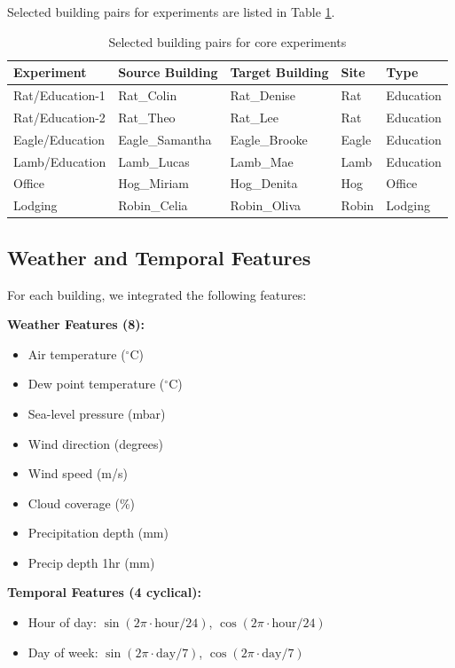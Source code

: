 \documentclass[12pt,a4paper]{report}
\begin{document}
Selected building pairs for experiments are listed in Table \ref{tab:selected_buildings}.

\begin{table}[H]
\centering
\caption{Selected building pairs for core experiments}
\label{tab:selected_buildings}
\begin{tabular}{lllll}
\toprule
\textbf{Experiment} & \textbf{Source Building} & \textbf{Target Building} & \textbf{Site} & \textbf{Type} \\
\midrule
Rat/Education-1 & Rat\_Colin & Rat\_Denise & Rat & Education \\
Rat/Education-2 & Rat\_Theo & Rat\_Lee & Rat & Education \\
Eagle/Education & Eagle\_Samantha & Eagle\_Brooke & Eagle & Education \\
Lamb/Education & Lamb\_Lucas & Lamb\_Mae & Lamb & Education \\
Office & Hog\_Miriam & Hog\_Denita & Hog & Office \\
Lodging & Robin\_Celia & Robin\_Oliva & Robin & Lodging \\
\bottomrule
\end{tabular}
\end{table}

\subsection{Weather and Temporal Features}

For each building, we integrated the following features:

\textbf{Weather Features (8):}
\begin{itemize}
    \item Air temperature (\(^\circ\)C)
    \item Dew point temperature (\(^\circ\)C)
    \item Sea-level pressure (mbar)
    \item Wind direction (degrees)
    \item Wind speed (m/s)
    \item Cloud coverage (\%)
    \item Precipitation depth (mm)
    \item Precip depth 1hr (mm)
\end{itemize}

\textbf{Temporal Features (4 cyclical):}
\begin{itemize}
    \item Hour of day: \(\sin(2\pi \cdot \text{hour}/24)\), \(\cos(2\pi \cdot \text{hour}/24)\)
    \item Day of week: \(\sin(2\pi \cdot \text{day}/7)\), \(\cos(2\pi \cdot \text{day}/7)\)
\end{itemize}
\end{document}
